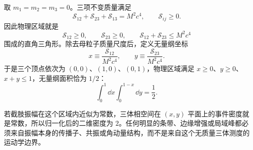 \begin{exbox}
取 $m_1=m_2=m_3=0$。三项不变质量满足
\begin{equation*}
 \mathcal S_{12}+\mathcal S_{23}+\mathcal S_{13}=M^2c^4,
 \qquad
 \mathcal S_{ij}\ge0.
\end{equation*}
因此物理区域就是
\begin{equation*}
 \mathcal S_{12}\ge0,
 \qquad
 \mathcal S_{23}\ge0,
 \qquad
 \mathcal S_{12}+\mathcal S_{23}\le M^2c^4
\end{equation*}
围成的直角三角形。除去母粒子质量尺度后，定义无量纲坐标
\begin{equation*}
 x\equiv\frac{\mathcal S_{12}}{M^2c^4},
 \qquad
 y\equiv\frac{\mathcal S_{23}}{M^2c^4}.
\end{equation*}
于是三个顶点依次为 $(0,0)$、$(1,0)$、$(0,1)$，物理区域满足 $x\ge0$、$y\ge0$、$x+y\le1$，无量纲面积恰为 $1/2$：
\begin{equation*}
 \int_0^1\dd x\int_0^{1-x}\dd y=\frac12.
\end{equation*}
\begin{center}
\end{center}
若截肢振幅在这个区域内近似为常数，三体相空间在 $(x,y)$ 平面上的事件密度就是常数，所以归一化后的二维密度为 $2$。任何明显的条带、边缘增强或局域峰都必须来自振幅本身的传播子、共振或角动量结构，而不是来自这个无质量三体测度的运动学边界。
\end{exbox}
